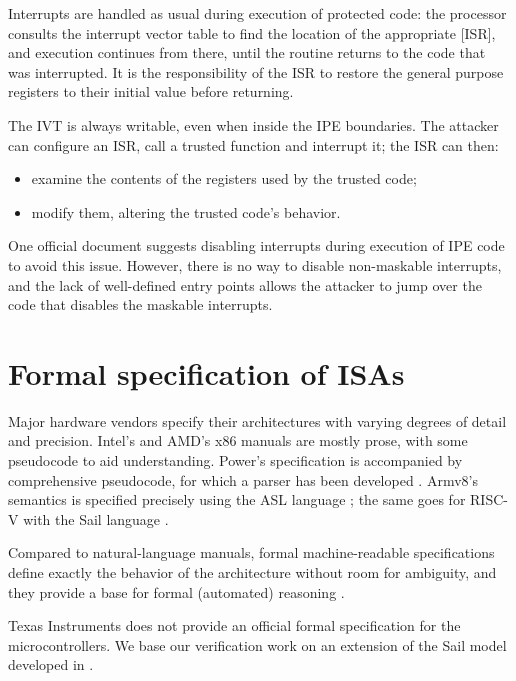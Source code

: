 Interrupts are handled as usual during execution of protected code: the processor consults the interrupt vector table to find the location of the appropriate [ISR], and execution continues from there, until the routine returns to the code that was interrupted. It is the responsibility of the ISR to restore the general purpose registers to their initial value before returning.

The IVT is always writable, even when inside the IPE boundaries. The attacker can configure an ISR, call a trusted function and interrupt it; the ISR can then:
\begin{itemize}
\item examine the contents of the registers used by the trusted code;
\item modify them, altering the trusted code's behavior.
\end{itemize}

One official document \cite{slaa685} suggests disabling interrupts during execution of IPE code to avoid this issue. However, there is no way to disable non-maskable interrupts, and the lack of well-defined entry points allows the attacker to jump over the code that disables the maskable interrupts.

\section{Formal specification of ISAs}
\label{sec:formal-isa}

Major hardware vendors specify their architectures with varying degrees of detail and precision. Intel's \cite{Intel2025} and AMD's \cite{AMD2024} x86 manuals are mostly prose, with some pseudocode to aid understanding. Power's specification \cite{OPF2024} is accompanied by comprehensive pseudocode, for which a parser has been developed \cite{libreSOC}. Armv8's semantics is specified precisely using the ASL language \cite{Arm2020}\cite{Reid2016}; the same goes for RISC-V with the Sail language \cite{RVSail}.

Compared to natural-language manuals, formal machine-readable specifications define exactly the behavior of the architecture without room for ambiguity, and they provide a base for formal (automated) reasoning \cite{Armstrong2018}.

Texas Instruments does not provide an official formal specification for the \msp microcontrollers. We base our verification work on an extension of the \msp Sail model developed in \cite{mspthesis}.


